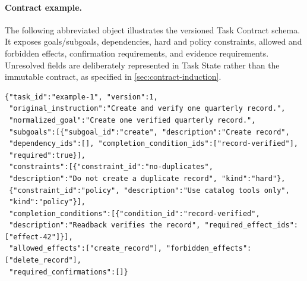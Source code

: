 \paragraph{Contract example.} The following abbreviated object illustrates the
versioned Task Contract schema. It exposes goals/subgoals, dependencies, hard and
policy constraints, allowed and forbidden effects, confirmation requirements, and
evidence requirements. Unresolved fields are deliberately represented in Task
State rather than the immutable contract, as specified in \cref{sec:contract-induction}.
\begin{verbatim}
{"task_id":"example-1", "version":1,
 "original_instruction":"Create and verify one quarterly record.",
 "normalized_goal":"Create one verified quarterly record.",
 "subgoals":[{"subgoal_id":"create", "description":"Create record",
 "dependency_ids":[], "completion_condition_ids":["record-verified"],
 "required":true}],
 "constraints":[{"constraint_id":"no-duplicates",
 "description":"Do not create a duplicate record", "kind":"hard"},
 {"constraint_id":"policy", "description":"Use catalog tools only",
 "kind":"policy"}],
 "completion_conditions":[{"condition_id":"record-verified",
 "description":"Readback verifies the record", "required_effect_ids":["effect-42"]}],
 "allowed_effects":["create_record"], "forbidden_effects":["delete_record"],
 "required_confirmations":[]}
\end{verbatim}
